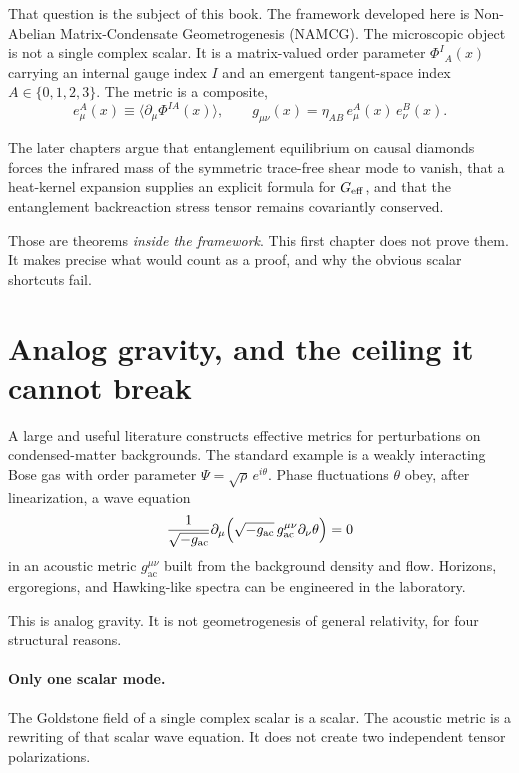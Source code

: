 That question is the subject of this book. The framework developed here
is Non-Abelian Matrix-Condensate Geometrogenesis (NAMCG). The
microscopic object is not a single complex scalar. It is a
matrix-valued order parameter \(\Phi^I{}_A(x)\) carrying an internal
gauge index \(I\) and an emergent tangent-space index
\(A\in\{0,1,2,3\}\). The metric is a composite,
\begin{equation}
  \label{eq:composite-metric}
  e^A_\mu(x)\equiv\langle\partial_\mu\Phi^{IA}(x)\rangle,\qquad
  g_{\mu\nu}(x)=\eta_{AB}\,e^A_\mu(x)\,e^B_\nu(x).
\end{equation}

The later chapters argue that entanglement equilibrium on causal
diamonds forces the infrared mass of the symmetric trace-free shear
mode to vanish, that a heat-kernel expansion supplies an explicit
formula for \(G_{\mathrm{eff}}\), and that the entanglement backreaction stress
tensor remains covariantly conserved.

Those are theorems \emph{inside the framework}. This first chapter does
not prove them. It makes precise what would count as a proof, and why
the obvious scalar shortcuts fail.

\section{Analog gravity, and the ceiling it cannot break}
\label{sec:ch1-analog}

A large and useful literature constructs effective metrics for
perturbations on condensed-matter backgrounds. The standard example is
a weakly interacting Bose gas with order parameter
\(\Psi=\sqrt{\rho}\,e^{i\theta}\). Phase fluctuations \(\theta\) obey,
after linearization, a wave equation
\begin{equation}
  \label{eq:acoustic-wave}
  \frac{1}{\sqrt{-g_{\mathrm{ac}}}}
  \partial_\mu\Bigl(
    \sqrt{-g_{\mathrm{ac}}}\,
    g_{\mathrm{ac}}^{\mu\nu}\partial_\nu\theta
  \Bigr)=0
\end{equation}
in an acoustic metric \(g_{\mathrm{ac}}^{\mu\nu}\) built from the
background density and flow. Horizons, ergoregions, and Hawking-like
spectra can be engineered in the laboratory.

This is analog gravity. It is not geometrogenesis of general
relativity, for four structural reasons.

\paragraph{Only one scalar mode.}
The Goldstone field of a single complex scalar is a scalar. The
acoustic metric is a rewriting of that scalar wave equation. It does
not create two independent tensor polarizations.

